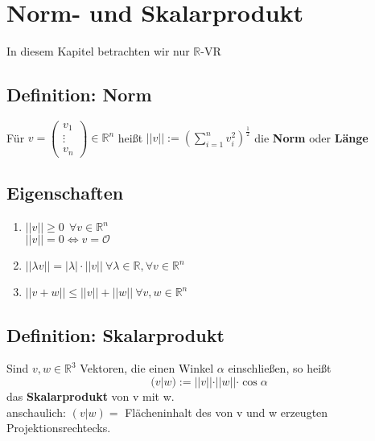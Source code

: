  


\section{Norm- und Skalarprodukt}
In diesem Kapitel betrachten wir nur $\mathbb{R}$-VR

\subsection{Definition: Norm}
Für $v=\begin{pmatrix}v_1 \\ \vdots \\ v_n\end{pmatrix}\in\mathbb{R}^n$ heißt $||v|| := (\sum_{i=1}^n v_i^2)^{\frac{1}{2}}$ die \textbf{Norm} oder \textbf{Länge}

\subsection{Eigenschaften}
\begin{enumerate}
	\item
	$||v|| \ge 0 \ \ \forall v\in\mathbb{R}^n$\\
	$||v|| = 0 \Leftrightarrow v=\mathcal{O}$
	
	\item
	$||\lambda v||=|\lambda|\cdot ||v|| \ \forall \lambda \in \mathbb{R}, \forall v\in\mathbb{R}^n$
	
	\item
	$||v+w|| \le ||v||+||w|| \ \forall v,w \in \mathbb{R}^n$
\end{enumerate}

\subsection{Definition: Skalarprodukt}
Sind $v,w \in \mathbb{R}^3$ Vektoren, die einen Winkel $\alpha$ einschließen, so heißt \[(v|w) := ||v||\cdot ||w||\cdot \cos \alpha\] das \textbf{Skalarprodukt} von v mit w.\\
anschaulich: $(v|w)=$ Flächeninhalt des von v und w erzeugten Projektionsrechtecks.

